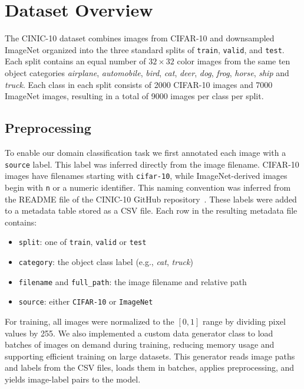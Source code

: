 \section{Dataset Overview}
\label{sec:Dataset Overview}
The CINIC-10 dataset combines images from CIFAR-10 and downsampled ImageNet organized into the three standard splits of \texttt{train}, \texttt{valid}, 
and \texttt{test}. Each split contains an equal number of $32 \times 32$ color images from the same ten object categories \textit{airplane}, 
\textit{automobile}, \textit{bird}, \textit{cat}, \textit{deer}, \textit{dog}, \textit{frog}, \textit{horse}, \textit{ship} and \textit{truck}.
Each class in each split consists of 2000 CIFAR-10 images and 7000 ImageNet images, resulting in a total of 9000 images per class per split.

\subsection{Preprocessing}
To enable our domain classification task we first annotated each image with a \texttt{source} label. This label was inferred directly from the 
image filename. CIFAR-10 images have filenames starting with \texttt{cifar-10}, while ImageNet-derived images begin with \texttt{n} or a numeric 
identifier. This naming convention was inferred from the README file of the CINIC-10 GitHub repository~\cite{cinic10_github}. These labels were 
added to a metadata table stored as a CSV file.
Each row in the resulting metadata file contains:
\begin{itemize}
  \item \texttt{split}: one of \texttt{train}, \texttt{valid} or \texttt{test}
  \item \texttt{category}: the object class label (e.g., \textit{cat}, \textit{truck})
  \item \texttt{filename} and \texttt{full\_path}: the image filename and relative path
  \item \texttt{source}: either \texttt{CIFAR-10} or \texttt{ImageNet}
\end{itemize}
For training, all images were normalized to the $[0, 1]$ range by dividing pixel values by 255.
We also implemented a custom data generator class to load batches of images on demand during training, reducing memory usage and supporting 
efficient training on large datasets. This generator reads image paths and labels from the CSV files, loads them in batches, applies preprocessing, 
and yields image-label pairs to the model.

